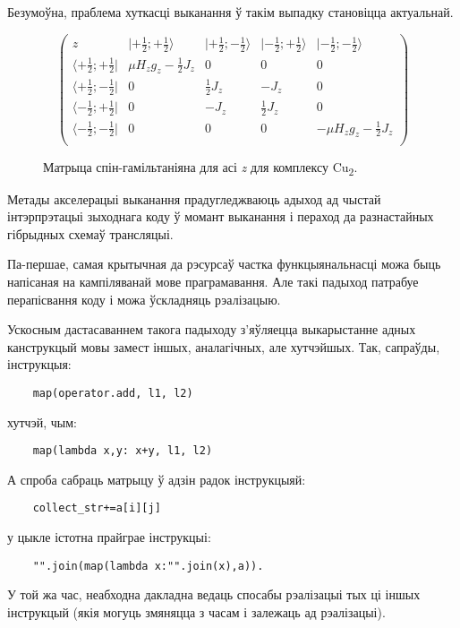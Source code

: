 \documentclass[a4paper,12pt]{article}
\begin{document}
Безумоўна, праблема хуткасці выканання ў такім выпадку становіцца актуальнай.


\begin{figure}[ht]
$$
\left(
\begin{array}{c|cccc}
\mathit{z}&|+\frac{1}{2};+\frac{1}{2}\rangle&|+\frac{1}{2};-\frac{1}{2}\rangle&|-\frac{1}{2};+\frac{1}{2}\rangle&|-\frac{1}{2};-\frac{1}{2}\rangle\\
\hline
\langle+\frac{1}{2};+\frac{1}{2}|&\mu H_zg_z-\frac{1}{2}J_z&0&0&0\\
\langle+\frac{1}{2};-\frac{1}{2}|&0&\frac{1}{2}J_z&-J_z&0\\
\langle-\frac{1}{2};+\frac{1}{2}|&0&-J_z&\frac{1}{2}J_z&0\\
\langle-\frac{1}{2};-\frac{1}{2}|&0&0&0&-\mu H_zg_z-\frac{1}{2}J_z\\
\end{array}
\right)
$$
\caption{Матрыца спін-гамільтаніяна для асі \textit{z} для комплексу Cu\textsubscript{2}.}
\label{fig:spin_ham}
\end{figure}

Метады акселерацыі выканання прадугледжваюць адыход ад чыстай інтэрпрэтацыі зыходнага коду ў момант выканання і пераход да разнастайных гібрыдных схемаў трансляцыі.

Па-першае, самая крытычная да рэсурсаў частка функцыянальнасці можа быць напісаная на кампіляванай мове праграмавання. Але такі падыход патрабуе перапісвання коду і можа ўскладняць рэалізацыю.

Ускосным дастасаваннем такога падыходу з'яўляецца выкарыстанне адных канструкцый мовы замест іншых, аналагічных, але хутчэйшых\cite{Optimize}.  Так, сапраўды, інструкцыя:
\begin{lstlisting}
    map(operator.add, l1, l2) 
\end{lstlisting}
хутчэй, чым:
\begin{lstlisting}
    map(lambda x,y: x+y, l1, l2)
\end{lstlisting}
 А спроба сабраць матрыцу ў адзін радок інструкцыяй:
\begin{lstlisting}
    collect_str+=a[i][j]  
\end{lstlisting}
 у цыкле істотна прайграе інструкцыі:
\begin{lstlisting} 
    "".join(map(lambda x:"".join(x),a)).
\end{lstlisting}
У той жа час, неабходна дакладна ведаць спосабы рэалізацыі тых ці іншых інструкцый (якія могуць змяняцца з часам і залежаць ад рэалізацыі).
\end{document}
